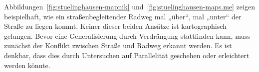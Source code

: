 \documentclass[../main/thesis.tex]{subfiles}
\begin{document}

Abbildungen~\ref{fig:stuelinghausen-mapnik} und~\ref{fig:stuelinghausen-maps.me} zeigen beispielhaft, wie ein straßenbegleitender Radweg mal „über“, mal „unter“ der Straße zu liegen kommt.
Keiner dieser beiden Ansätze ist kartographisch gelungen.
Bevor eine Generalisierung durch Verdrängung stattfinden kann, muss zunächst der Konflikt zwischen Straße und Radweg erkannt werden.
Es ist denkbar, dass dies durch Untersuchen auf Parallelität geschehen oder erleichtert werden könnte.
\end{document}
